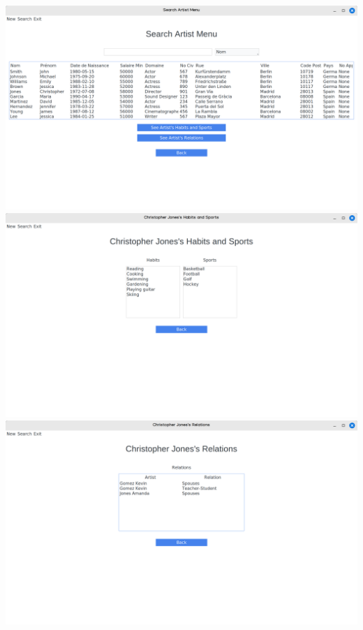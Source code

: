 \documentclass{article}
\newcommand{\n}{\\ [6pt]}
\begin{document}
\begin{center}
  \includegraphics[scale=0.16]{searchartist.png}\n
  \includegraphics[scale=0.16]{habitsports.png}\n
  \includegraphics[scale=0.16]{artistrelation.png}
\end{center}
\end{document}
